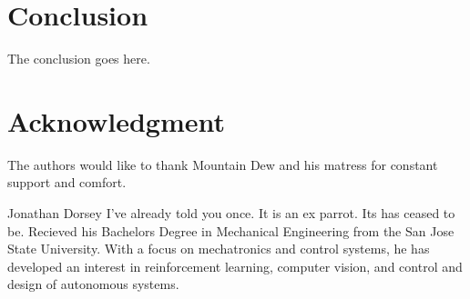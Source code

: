 \documentclass[journal]{IEEEtran}
\begin{document}
\section{Conclusion}
The conclusion goes here.


\section*{Acknowledgment}


The authors would like to thank Mountain Dew and his matress for constant support and comfort.



\ifCLASSOPTIONcaptionsoff
  \newpage
\fi

\cite{craig_introduction_2005}
\cite{khalil_nonlinear_2002}
\cite{rawlings_model_2017}
\cite{armstrong_explicit_1986}
\cite{ogata_modern_2010}
\cite{meriam_engineering_1993}
\cite{greenwood_advanced_2006}
\cite{borrelli_predictive_2017}
\cite{boyd_convex_2004}
\cite{slotine_applied_1991}


\begin{IEEEbiography}{Jonathan Dorsey}
  I've already told you once. It is an ex parrot. Its has ceased to be. Recieved his Bachelors Degree in Mechanical Engineering from the San Jose State University. With a focus on mechatronics and control systems, he has developed an interest in reinforcement learning, computer vision, and control and design of autonomous systems.
\end{IEEEbiography}
\end{document}
